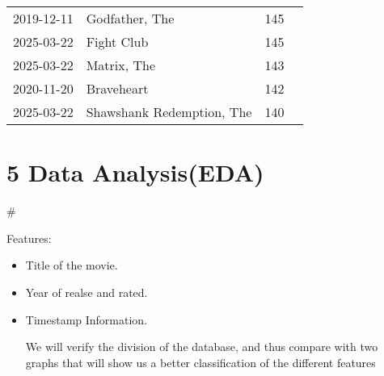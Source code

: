 \documentclass[11pt]{article}
\begin{document}
\begin{tabular}{r|lll}
	 2019-12-11                                                              & Godfather, The                                                          & 145                                                                    \\
	 2025-03-22                                                              & Fight Club                                                              & 145                                                                    \\
	 2025-03-22                                                              & Matrix, The                                                             & 143                                                                    \\
	 2020-11-20                                                              & Braveheart                                                              & 142                                                                    \\
	 2025-03-22                                                              & Shawshank Redemption, The                                               & 140                                                                    \\
\end{tabular}


    
    \section{5 Data Analysis(EDA)}\label{data-analysiseda}

    \#

Features:

\begin{itemize}
\item
  Title of the movie.
\item
  Year of realse and rated.
\item
  Timestamp Information.

  We will verify the division of the database, and thus compare with two
  graphs that will show us a better classification of the different
  features
\end{itemize}
\end{document}
